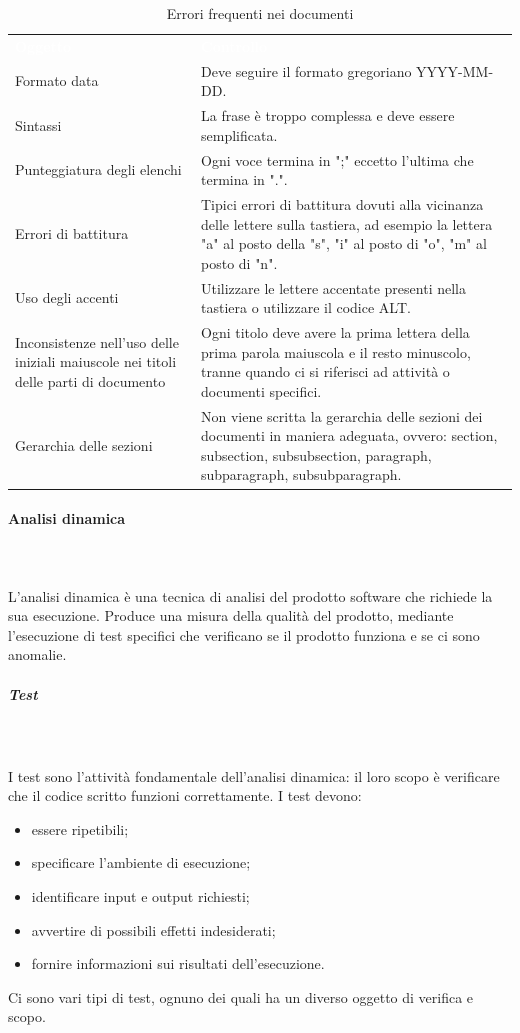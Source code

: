 \begin{table}[H]
\caption{Errori frequenti nei documenti}
\begin{center}
\begin{tabular}{C{4.5cm} C{11cm}}
\textcolor{white}{\textbf{Oggetto}} & \centerline{\textcolor{white}{\textbf{Controllo}}} \\
Formato data & Deve seguire il formato gregoriano YYYY-MM-DD. \\
Sintassi & La frase è troppo complessa e deve essere semplificata. \\
Punteggiatura degli elenchi & Ogni voce termina in ";" eccetto l'ultima che termina in ".".\\
Errori di battitura & Tipici errori di battitura dovuti alla vicinanza delle
lettere sulla tastiera, ad esempio la lettera "a" al posto della "s", "i" al posto di "o", "m" al posto di "n". \\
Uso degli accenti & Utilizzare le lettere accentate presenti nella tastiera o utilizzare il codice ALT. \\
Inconsistenze nell’uso delle iniziali maiuscole nei titoli delle parti di documento & Ogni titolo deve avere la prima lettera della prima parola maiuscola e il resto minuscolo, tranne quando ci si riferisci ad attività o documenti specifici. \\
Gerarchia delle sezioni & Non viene scritta la gerarchia delle sezioni dei documenti in maniera adeguata, ovvero: section, subsection, subsubsection, paragraph, subparagraph, subsubparagraph. \\
\end{tabular}
\end{center}
\end{table}

\paragraph*{Analisi dinamica} \mbox{} \\ \mbox{} \\
L'analisi dinamica è una tecnica di analisi del prodotto software che richiede la sua esecuzione. Produce una misura della qualità del prodotto, mediante l'esecuzione di test specifici che verificano se il prodotto funziona e se ci sono anomalie.
\pagebreak
\subparagraph{Test} \mbox{} \\ \mbox{} \\
I test sono l'attività fondamentale dell'analisi dinamica: il loro scopo è verificare che il codice
scritto funzioni correttamente. I test devono:
\begin{itemize}
\item essere ripetibili;
\item specificare l'ambiente di esecuzione;
\item identificare input e output richiesti;
\item avvertire di possibili effetti indesiderati;
\item fornire informazioni sui risultati dell'esecuzione.
\end{itemize}
Ci sono vari tipi di test, ognuno dei quali ha un diverso oggetto di verifica e scopo.

